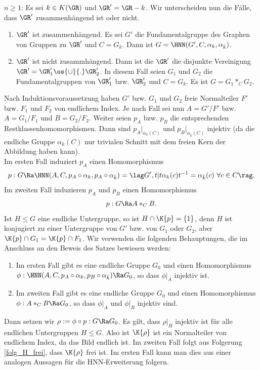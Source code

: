 $n\geq 1$: Es sei $k\in K(\GR)$ und $\GR'=\GR-k$.
Wir unterscheiden nun die Fälle, dass $\GR'$ zusammenhängend ist
oder nicht.
\begin{enumerate}
\item $\GR'$ ist zusammenhängend. Es sei $G'$ die
Fundamentalgruppe des Graphen von Gruppen zu $\GR'$ und $C=G_k$.
Dann ist $G=\HNN(G',C,\alpha_k,\alpha_{\bar{k}})$.
\item $\GR'$ ist nicht zusammhängend. Dann ist die $\GR'$
die disjunkte Vereinigung $\GR'=\GR'_1 \os{\cup}{.} \GR'_2$.
In diesem Fall seien $G_1$ und $G_2$ die Fundamentalgruppen von
$\GR'_1$ bzw. $\GR'_2$ und $C=G_k$.
Es ist $G=G_1 *_C G_2$.
\end{enumerate}
Nach Induktionsvoraussetzung haben $G'$ bzw. $G_1$ und $G_2$ freie
Normalteiler $F'$ bzw. $F_1$ und $F_2$ von endlichem Index.
Je nach Fall sei nun $A=G'/F'$ bzw. $A=G_1/F_1$ und $B=G_2/F_2$.
Weiter seien $p_A$ bzw. $p_B$ die entsprechenden 
Restklassenhomomorphismen. Dann sind $p_A|_{\alpha_k(C)}$ und
$p_B|_{\alpha_{\bar{k}}(C)}$ injektiv (da die endliche Gruppe
$\alpha_k(C)$ nur trivialen Schnitt mit dem freien Kern der
Abbildung haben kann).\\
Im ersten Fall induziert $p_A$ einen Homomorphismus
\[
p:G\Ra\HNN(A,C,p_A\circ\alpha_k,p_A\circ\alpha_{\bar{k}})
=
\lag G',t | t\alpha_k(c) t^{-1}=\alpha_{\bar{k}}(c)\
\forall c\in C\rag.
\]
Im zweiten Fall induzieren $p_A$ und $p_B$ einen Homomorphismus
\[
p:G\Ra A *_C B.
\]
Ist $H\leq G$ eine endliche Untergruppe, so ist $H\cap\K{p}=\{1\}$,
denn $H$ ist konjugiert zu einer Untergruppe von $G'$ bzw. von 
$G_1$ oder $G_2$, aber $\K{p}\cap G_1=\K{p}\cap F_1$.
Wir verwenden die folgenden Behauptungen, die im Anschluss an den
Beweis des Satzes bewiesen werden:
\begin{enumerate}
\item Im ersten Fall gibt es eine endliche Gruppe $G_0$ und einen
Homomorphismus
$\phi:\HNN(A,C,p_A\circ\alpha_k,p_B\circ\alpha_{\bar{k}})\Ra G_0$,
so dass $\phi|_A$ injektiv ist.
\item Im zweiten Fall gibt es eine endliche Gruppe $G_0$ und einen
Homomorphismus $\phi:A*_C B\Ra G_0$, so dass $\phi|_A$ und $\phi|_B$
injektiv sind.
\end{enumerate}
Dann setzen wir $\rho:=\phi\circ p:G\Ra G_0$. Es gilt, dass $\rho|_H$
injektiv ist für alle endlichen Untergruppen $H\leq G$.
Also ist $\K{\rho}$ ist ein Normalteiler von endlichem Index,
da das Bild endlich ist. Im zweiten Fall folgt aus
Folgerung \ref{folg_H_frei}, dass $\K{\rho}$ frei ist.
Im ersten Fall kann man dies aus einer analogen Aussagen für
die HNN-Erweiterung folgern.


